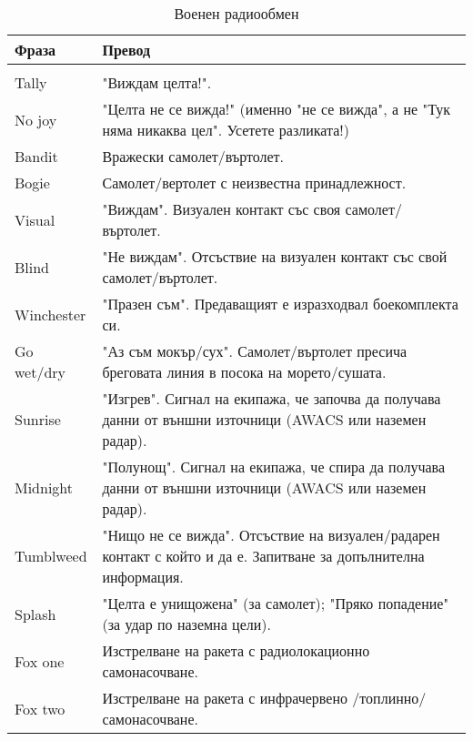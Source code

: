 \begin{longtable}
{|p{}|p{}|}
\hline
\textbf{Фраза} & \textbf{Превод} \\
\hline
\endhead
\hline
\endfoot
\hline
\caption{Военен радиообмен} \label{tab:callouts} \\
\endlastfoot
\hline

Tally & "Виждам целта!".\\
No joy & "Целта не се вижда!" (именно "не се вижда", а не "Тук няма никаква цел". Усетете разликата!)\\

Bandit & Вражески самолет/въртолет.\\

Bogie & Самолет/вертолет с неизвестна принадлежност.\\

Visual & "Виждам". Визуален контакт със своя самолет/въртолет.\\ 

Blind & "Не виждам". Отсъствие на визуален контакт със свой самолет/въртолет.\\

Winchester & "Празен съм". Предаващият е изразходвал боекомплекта си.\\

Go wet/dry & "Аз съм мокър/сух". Самолет/въртолет пресича бреговата линия в посока на морето/сушата.\\

Sunrise & "Изгрев". Сигнал на екипажа, че започва да получава данни от външни източници (AWACS или наземен радар).\\

Midnight & "Полунощ". Сигнал на екипажа, че спира да получава данни от външни източници (AWACS или наземен радар).\\

Tumblweed & "Нищо не се вижда". Отсъствие на визуален/радарен контакт с който и да е. Запитване за допълнителна информация.\\

Splash & "Целта е унищожена" (за самолет); "Пряко попадение" (за удар по наземна цели).\\

Fox one & Изстрелване на ракета с радиолокационно самонасочване.\\

Fox two & Изстрелване на ракета с инфрачервено /топлинно/ самонасочване.\\


\end{longtable}

